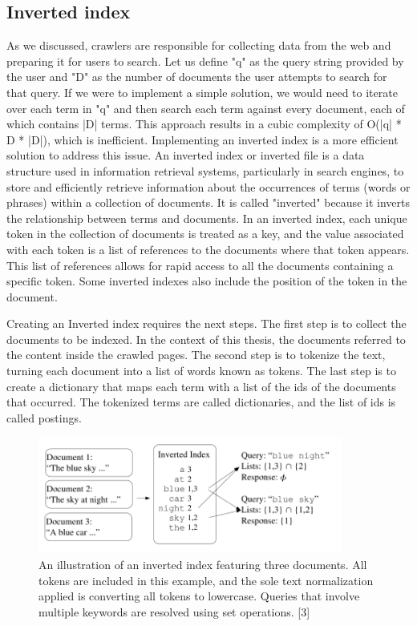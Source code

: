 \subsection*{Inverted index}
As we discussed, crawlers are responsible for collecting data from the web and preparing it for users to search. Let us define "q" as the query string provided by the user and "D" as the number of documents the user attempts to search for that query. If we were to implement a simple solution, we would need to iterate over each term in "q" and then search each term against every document, each of which contains |D| terms. This approach results in a cubic complexity of O(|q| * D * |D|), which is inefficient. Implementing an inverted index is a more efficient solution to address this issue. An inverted index or inverted file is a data structure used in information retrieval systems, particularly in search engines, to store and efficiently retrieve information about the occurrences of terms (words or phrases) within a collection of documents. It is called "inverted" because it inverts the relationship between terms and documents.
In an inverted index, each unique token in the collection of documents is treated as a key, and the value associated with each token is a list of references to the documents where that token appears. This list of references allows for rapid access to all the documents containing a specific token. Some inverted indexes also include the position of the token in the document. 

Creating an Inverted index requires the next steps. The first step is to collect the documents to be indexed. In the context of this thesis, the documents referred to the content inside the crawled pages. The second step is to tokenize the text, turning each document into a list of words known as tokens. The last step is to create a dictionary that maps each term with a list of the ids of the documents that occurred. The tokenized terms are called dictionaries, and the list of ids is called postings. 

\begin{figure}[h]	
     \centering
     \includegraphics[width=10cm]{images/inverted_index.png}
     \caption{
An illustration of an inverted index featuring three documents. All tokens are included in this example, and the sole text normalization applied is converting all tokens to lowercase. Queries that involve multiple keywords are resolved using set operations. [3]}
     \label{fig:google-arch}
\end{figure}

